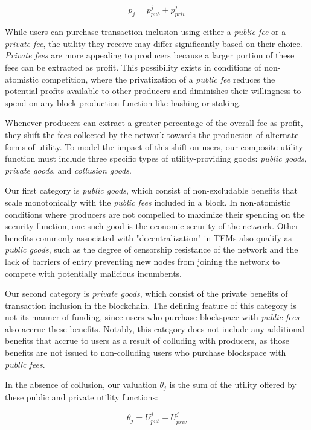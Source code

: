 \documentclass[oneside]{article}   	%
\begin{document}
$$
p_j = p_{pub}^j + p_{priv}^j
$$

While users can purchase transaction inclusion using either a \textit{public fee} or a \textit{private fee}, the utility they receive may differ significantly based on their choice. \textit{Private fees} are more appealing to producers because a larger portion of these fees can be extracted as profit. This possibility exists in conditions of non-atomistic competition, where the privatization of a \textit{public fee} reduces the potential profits available to other producers and diminishes their willingness to spend on any block production function like hashing or staking.

Whenever producers can extract a greater percentage of the overall fee as profit, they shift the fees collected by the network towards the production of alternate forms of utility. To model the impact of this shift on users, our composite utility function must include three specific types of utility-providing goods: \textit{public goods}, \textit{private goods}, and \textit{collusion goods}.

Our first category is \textit{public goods}, which consist of non-excludable benefits that scale monotonically with the \textit{public fees} included in a block. In non-atomistic conditions where producers are not compelled to maximize their spending on the security function, one such good is the economic security of the network. Other benefits commonly associated with "decentralization" in TFMs also qualify as \textit{public goods}, such as the degree of censorship resistance of the network and the lack of barriers of entry preventing new nodes from joining the network to compete with potentially malicious incumbents.

Our second category is \textit{private goods}, which consist of the private benefits of transaction inclusion in the blockchain. The defining feature of this category is not its manner of funding, since users who purchase blockspace with \textit{public fees} also accrue these benefits. Notably, this category does not include any additional benefits that accrue to users as a result of colluding with producers, as those benefits are not issued to non-colluding users who purchase blockspace with \textit{public fees}.

In the absence of collusion, our valuation $\theta_j$ is the sum of the utility offered by these public and private utility functions:

$$
\theta_j = U_{pub}^j + U_{priv}^j
$$
\end{document}
